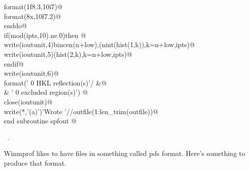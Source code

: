 \documentclass[10pt,a4paper,notitlepage]{article}
\begin{document}
\begin{flushleft}
\begin{minipage}{\linewidth}
\begin{list}{}{}
\mbox{}     format(1f8.3,10i7)@\\
\mbox{}     format(8x,10f7.2)@\\
\mbox{}\verb@       enddo@\\
\mbox{}\verb@       if(mod(ipts,10).ne.0)then @\\
\mbox{}\verb@       write(ioutunit,4)bincen(n+low),(nint(hist(1,k)),k=n+low,ipts)@\\
\mbox{}\verb@       write(ioutunit,5)(hist(2,k),k=n+low,ipts)@\\
\mbox{}\verb@       endif@\\
\mbox{}\verb@       write(ioutunit,6)@\\
\mbox{}     format('       0 HKL reflection(s)'/                             &@\\
\mbox{}\verb@      & '       0 excluded region(s)')                                  @\\
\mbox{}\verb@       close(ioutunit)@\\
\mbox{}\verb@       write(*,'(a)')'Wrote '//outfile(1:len_trim(outfile))@\\
\mbox{}\verb@       end subroutine spfout                                                 @{\NWsep}
\end{list}
\vspace{-1.5ex}
\footnotesize
\begin{list}{}{\setlength{\itemsep}{-\parsep}\setlength{\itemindent}{-\leftmargin}}
\item \NWtxtMacroRefIn\ .

\item{}
\end{list}
\end{minipage}\vspace{4ex}
\end{flushleft}
Winmprof likes to have files in something called pds format.
Here's something to produce that format.
\end{document}
